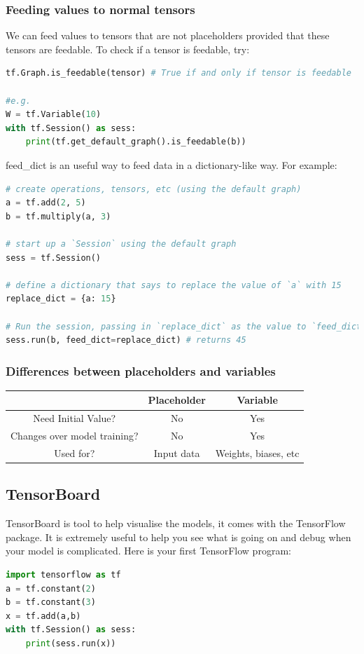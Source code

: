 \documentclass{article}
\begin{document}
	\subsubsection{Feeding values to normal tensors}
	We can feed values to tensors that are not placeholders provided that these tensors are feedable. To check if a tensor is feedable, try: 
\begin{lstlisting}[language=Python,morekeywords ={as}]
tf.Graph.is_feedable(tensor) # True if and only if tensor is feedable

#e.g.
W = tf.Variable(10)
with tf.Session() as sess:
    print(tf.get_default_graph().is_feedable(b))
\end{lstlisting}\medskip
\colorbox{backcolour}{feed\_dict} is an useful way to feed data in a dictionary-like way. For example:
\begin{lstlisting}[language=Python,morekeywords ={as}]
# create operations, tensors, etc (using the default graph)
a = tf.add(2, 5)
b = tf.multiply(a, 3)

# start up a `Session` using the default graph
sess = tf.Session()

# define a dictionary that says to replace the value of `a` with 15
replace_dict = {a: 15}

# Run the session, passing in `replace_dict` as the value to `feed_dict`
sess.run(b, feed_dict=replace_dict) # returns 45	
\end{lstlisting}
	\subsubsection{Differences between placeholders and variables}
	\begin{center}
	\begin{tabular}{| c | c | c |}
		\hline
		&Placeholder & Variable\\
		\hline
		Need Initial Value? & No & Yes\\
		Changes over model training? & No & Yes\\
		Used for? & Input data & Weights, biases, etc\\
		\hline
	\end{tabular}
	\end{center}
	\medskip
	\subsection{TensorBoard}
	TensorBoard is tool to help visualise the models, it comes with the TensorFlow package. It is extremely useful to help you see what is going on and debug when your model is complicated.
	\noindent Here is your first TensorFlow program:
\begin{lstlisting}[language=Python,morekeywords ={as}]
import tensorflow as tf
a = tf.constant(2)
b = tf.constant(3)
x = tf.add(a,b)
with tf.Session() as sess:
    print(sess.run(x))
\end{lstlisting}
\end{document}
